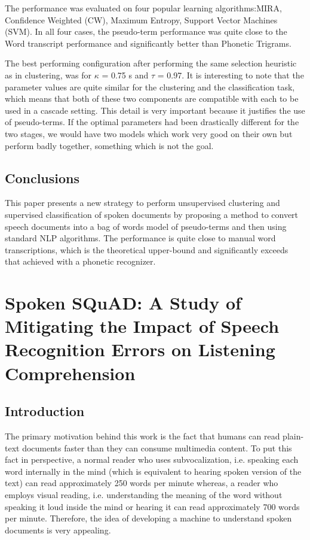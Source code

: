\documentclass[a4paper]{article}
\begin{document}
The performance was evaluated on four popular learning algorithms:MIRA, Confidence Weighted (CW), Maximum Entropy, Support Vector Machines (SVM). In all four cases, the pseudo-term performance was quite close to the Word transcript performance and significantly better than Phonetic Trigrams.

The best performing configuration after performing the same selection heuristic as in clustering, was for $\kappa$ = 0.75 s and $\tau$ = 0.97. It is interesting to note that the parameter values are quite similar for the clustering and the classification task, which means that both of these two components are compatible with each to be used in a cascade setting. This detail is very important because it justifies the use of pseudo-terms. If the optimal parameters had been drastically different for the two stages, we would have two models which work very good on their own but perform badly together, something which is not the goal.


\subsection{Conclusions}
This paper presents a new strategy to perform unsupervised clustering and supervised classification of spoken documents by proposing a method to convert speech documents into a bag of words model of pseudo-terms and then using standard NLP algorithms. The performance is quite close to manual word transcriptions, which is the theoretical upper-bound and significantly exceeds that achieved with a phonetic recognizer.

\section{Spoken SQuAD: A Study of Mitigating the Impact of Speech Recognition Errors on Listening Comprehension}
\subsection{Introduction}
The primary motivation behind this work is the fact that humans can read plain-text documents faster than they can consume multimedia content. To put this fact in perspective, a normal reader who uses subvocalization, i.e. speaking each word internally in the mind (which is equivalent to hearing spoken version of the text) can read approximately 250 words per minute whereas, a reader who employs visual reading, i.e. understanding the meaning of the word without speaking it loud inside the mind or hearing it can read approximately 700 words per minute. Therefore, the idea of developing a machine to understand spoken documents is very appealing.
\end{document}
